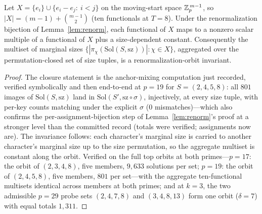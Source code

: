 \begin{lemma}\label{lem:char10}
Let $X=\{e_i\}\cup\{e_i-e_j:\ i<j\}$ on the moving-start space
$\mathbb{Z}_p^{\,m-1}$, so $|X|=(m-1)+\binom{m-1}{2}$ (ten functionals at
$T=8$). Under the renormalization bijection of Lemma~\ref{lem:renorm},
each functional of $X$ maps to a nonzero scalar multiple of a
functional of $X$ plus a size-dependent constant. Consequently the
multiset of marginal sizes
$\{|\pi_\chi(\mathrm{Sol}(S,\mathrm{sz}))|:\chi\in X\}$, aggregated
over the permutation-closed set of size tuples, is a
renormalization-orbit invariant.
\end{lemma}

\begin{proof}
The closure statement is the anchor-mixing computation just recorded,
verified symbolically and then end-to-end at $p=19$ for
$S=(2,4,5,8)$: all $801$ images of $\mathrm{Sol}(S,\mathrm{sz})$ land
in $\mathrm{Sol}(S',\mathrm{sz}\circ\sigma)$, injectively, at every
size tuple, with per-key counts matching under the explicit $\sigma$
($0$ mismatches)---which also confirms the per-assignment-bijection
step of Lemma~\ref{lem:renorm}'s proof at a stronger level than the
committed record (totals were verified; assignments now are). The
invariance follows: each character's marginal size is carried to
another character's marginal size up to the size permutation, so the
aggregate multiset is constant along the orbit. Verified on the full
top orbits at both primes---$p=17$: the orbit of $(2,3,4,8)$, five
members, $9{,}633$ solutions per set; $p=19$: the orbit of
$(2,4,5,8)$, five members, $801$ per set---with the aggregate
ten-functional multisets identical across members at both primes; and
at $k=3$, the two admissible $p=29$ probe sets $(2,4,7,8)$ and
$(3,4,8,13)$ form one orbit ($\delta=7$) with equal totals $1{,}311$.
\end{proof}

